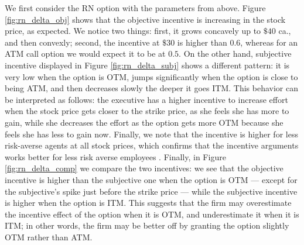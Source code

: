 \vspace{1em}


We first consider the RN option with the parameters from above. Figure \ref*{fig:rn_delta_obj} shows that the objective incentive is increasing in the stock price, as expected. We notice two things: first, it grows concavely up to $\$40$ ca., and then convexly; second, the incentive at $\$30$ is higher than $0.6$, whereas for an ATM call option we would expect it to be at $0.5$. On the other hand, subjective incentive displayed in Figure \ref*{fig:rn_delta_subj} shows a different pattern: it is very low when the option is OTM, jumps significantly when the option is close to being ATM, and then decreases slowly the deeper it goes ITM. This behavior can be interpreted as follows: the executive has a higher incentive to increase effort when the stock price gets closer to the strike price, as she feels she has more to gain, while she decreases the effort as the option gets more OTM because she feels she has less to gain now. Finally, we note that the incentive is higher for less risk-averse agents at all stock prices, which confirms that the incentive arguments works better for less risk averse employees \citep{lau2005valuation}. Finally, in Figure \ref*{fig:rn_delta_comp} we compare the two incentives: we see that the objective incentive is higher than the subjective one when the option is OTM --- except for the subjective's spike just before the strike price --- while the subjective incentive is higher when the option is ITM. This suggests that the firm may overestimate the incentive effect of the option when it is OTM, and underestimate it when it is ITM; in other words, the firm may be better off by granting the option slightly OTM rather than ATM.

